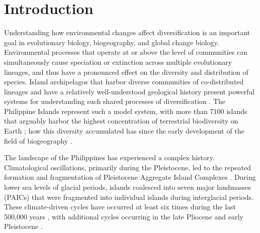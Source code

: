 \section{Introduction}

Understanding how environmental changes affect diversification is an important
goal in evolutionary biology, biogeography, and global change biology.
Environmental processes that operate at or above the level of communities can
simultaneously cause speciation or extinction across multiple evolutionary
lineages, and thus have a pronounced effect on the diversity and distribution
of species.
Island archipelagos that harbor diverse communities of co-distributed lineages
and have a relatively well-understood geological history present powerful
systems for understanding such shared processes of diversification
\citep{Gillespie2007,Losos2009,Vences2009,Rafe2013AREES}.
The Philippine Islands represent such a model system, with more than 7100
islands that arguably harbor the highest concentration of terrestrial
biodiversity on Earth
\citep{CatibogSinha2006,RafeDiesmos2009, Heaney1998,Rafe2013AREES};
how this diversity accumulated has  since the
early development of the field of biogeography
.

The landscape of the Philippines has experienced a complex history.
Climatological oscillations, primarily during the Pleistocene, led to the
repeated formation and fragmentation of Pleistocene Aggregate Island Complexes
\citep[PAICs;][]{Inger1954,Heaney1985,RafeDiesmos2001,RafeDiesmos2009,Esselstyn2009MPE,Lomolino2016chap12,Siler2010,Rafe2013}.
During lower sea levels of glacial periods, islands coalesced into seven major
landmasses (PAICs) that were fragmented into individual islands during
interglacial periods.
These climate-driven cycles have occurred at least six times during the last
500,000 years \citep{Rohling1998,Siddall2003}, with additional cycles
occurring in the late Pliocene and early Pleistocene
\citep{Haq1987,Miller2005}.

